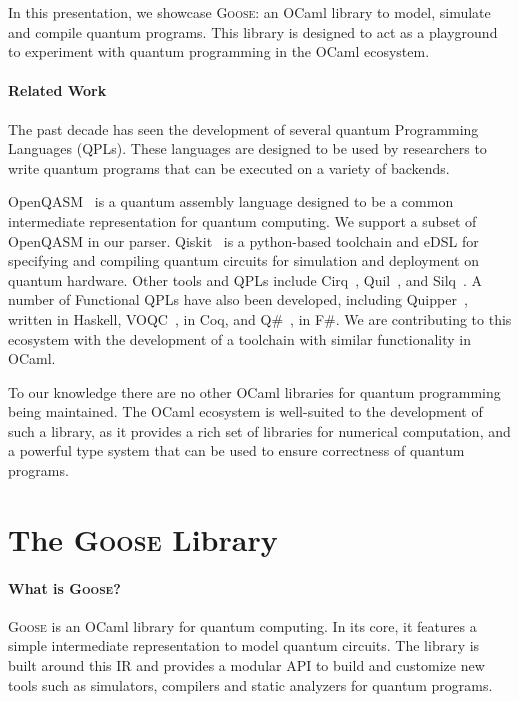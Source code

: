 \documentclass[a4paper]{easychair}
\newcommand{\projname}{\textsc{Goose}}
\begin{document}
In this presentation, we showcase \projname{}: an OCaml library to model, simulate and compile quantum programs. This library is designed to act as a playground to experiment with quantum programming in the OCaml ecosystem.

\paragraph*{Related Work}

The past decade has seen the development of several quantum Programming Languages (QPLs). These languages are designed to be used by researchers to write quantum programs that can be executed on a variety of backends.

OpenQASM~\cite{Cross2022} is a quantum assembly language designed to be a common intermediate representation for quantum computing.  We support a subset of OpenQASM in our parser. Qiskit~\cite{Qiskit} is a python-based toolchain and eDSL for specifying and compiling quantum circuits for simulation and deployment on quantum hardware. Other tools and QPLs include Cirq~\cite{Cirq2018}, Quil~\cite{Quil2016}, and Silq~\cite{Bichsel2020}. A number of Functional QPLs have also been developed, including Quipper~\cite{Green2013}, written in Haskell, VOQC~\cite{Hietala2021}, in Coq, and Q\#~\cite{Svore2018}, in F\#. We are contributing to this ecosystem with the development of a toolchain with similar functionality in OCaml.

To our knowledge there are no other OCaml libraries for quantum programming being maintained. The OCaml ecosystem is well-suited to the development of such a library, as it provides a rich set of libraries for numerical computation, and a powerful type system that can be used to ensure correctness of quantum programs.

\section{The \projname{} Library}

\paragraph*{What is \projname{}?} \projname{} is an OCaml library for quantum computing. In its core, it features a simple intermediate representation to model quantum circuits. The library is built around this IR and provides a modular API to build and customize new tools such as simulators, compilers and static analyzers for quantum programs.
\end{document}

